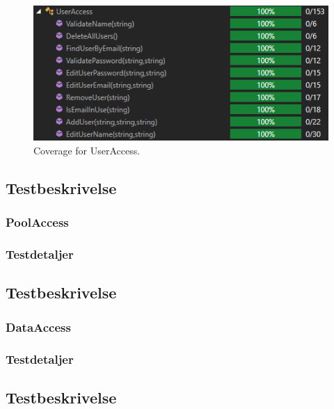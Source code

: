 \begin{figure}[H]
	\centering
	\includegraphics[width=0.7\linewidth]{figs/test/useraccesscoverage}
	\caption{Coverage for UserAccess.}
	\label{fig:useraccesscoverage}
\end{figure}

\subsection{Testbeskrivelse}

\subsubsection{PoolAccess}

\subsubsection{Testdetaljer}



\subsection{Testbeskrivelse}

\subsubsection{DataAccess}

\subsubsection{Testdetaljer}



\subsection{Testbeskrivelse}

